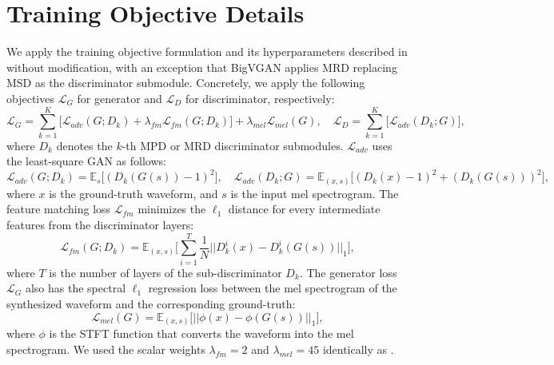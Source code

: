 \documentclass{article} \usepackage{iclr2023_conference,times}
\theoremstyle{plain}
\theoremstyle{definition}
\theoremstyle{remark}
\begin{document}
\section{Training Objective Details}
\label{appendix:loss_detail}
We apply the training objective formulation and its hyperparameters described in \citep{kong2020hifi} without modification, with an exception that BigVGAN applies MRD replacing MSD as the discriminator submodule. Concretely, we apply the following objectives $\mathcal{L}_G$ for generator and $\mathcal{L}_D$ for discriminator, respectively:
\vspace{-0.3em}
\begin{equation}
    \mathcal{L}_G=\sum_{k=1}^{K}\bigg[\mathcal{L}_{adv}(G;D_k)+\lambda_{fm}\mathcal{L}_{fm}(G;D_k)\bigg]+\lambda_{mel}\mathcal{L}_{mel}(G), \quad \mathcal{L}_D = \sum_{k=1}^{K}\bigg[\mathcal{L}_{adv}(D_k;G)\bigg],
\end{equation}
where $D_k$ denotes the $k$-th MPD or MRD discriminator submodules. $\mathcal{L}_{adv}$ uses the least-square GAN \citep{mao2017least} as follows:
\vspace{-0.3em}
\begin{equation}
    \mathcal{L}_{adv}(G;D_k) = \mathbb{E}_s \Big[(D_k(G(s))-1)^2\Big], \quad \mathcal{L}_{adv}(D_k;G)= \mathbb{E}_{(x,s)}\Big[(D_k(x)-1)^2+(D_k(G(s)))^2\Big],
\end{equation}
where $x$ is the ground-truth waveform, and $s$ is the input mel spectrogram. The feature matching loss $\mathcal{L}_{fm}$ \citep{larsen2016autoencoding, kumar2019melgan} minimizes the $\ell_1$ distance for every intermediate features from the discriminator layers:
\vspace{-0.3em}
\begin{equation}
    \mathcal{L}_{fm}(G;D_k)= \mathbb{E}_{(x,s)}\bigg[\sum_{i=1}^{T}\frac{1}{N}||D_k^i(x)-D_k^i(G(s))||_1\bigg],
\end{equation}
where $T$ is the number of layers of the sub-discriminator $D_k$. The generator loss $\mathcal{L}_G$ also has the spectral $\ell_1$ regression loss between the mel spectrogram of the synthesized waveform and the corresponding ground-truth:
\vspace{-0.3em}
\begin{equation}
    \mathcal{L}_{mel}(G) = \mathbb{E}_{(x,s)}\bigg[||\phi(x)-\phi(G(s))||_1\bigg],
\end{equation}
where $\phi$ is the STFT function that converts the waveform into the mel spectrogram. We used the scalar weights $\lambda_{fm}=2$ and $\lambda_{mel}=45$ identically as \citep{kong2020hifi}.
\end{document}
